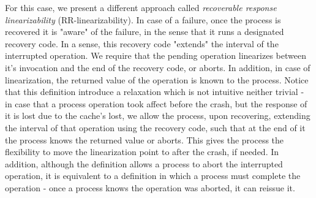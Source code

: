 \documentclass{article}
\begin{document}
For this case, we present a different approach called \emph{recoverable response linearizability} (RR-linearizability). In case of a failure, once the process is recovered it is "aware" of the failure, in the sense that it runs a designated recovery code. In a sense, this recovery code "extends" the interval of the interrupted operation. We require that the pending operation linearizes between it's invocation and the end of the recovery code, or aborts. In addition, in case of linearization, the returned value of the operation is known to the process. Notice that this definition introduce a relaxation which is not intuitive neither trivial - in case that a process operation took affect before the crash, but the response of it is lost due to the cache's lost, we allow the process, upon recovering, extending the interval of that operation using the recovery code, such that at the end of it the process knows the returned value or aborts. This gives the process the flexibility to move the linearization point to after the crash, if needed. In addition, although the definition allows a process to abort the interrupted operation, it is equivalent to a definition in which a process must complete the operation - once a process knows the operation was aborted, it can reissue it.


\iffalse
Progress properties are formally defined using histories. We follow [*] for these definitions. There are four types of steps: (1) an invocation step, denoted $(INV, p, X, op)$, represents the invocation by process $p$ of operation $op$ on implemented object $X$; (2) a response step, denoted $(RES, p, X, ret)$, represents the completion by process $p$ of the last operation it invoked on object $X$, with response $ret$; (3) a crash step, denoted $(CRASH, p)$, denotes a crash of process $p$; (4) a recovery step, denoted $(REC, p)$, denotes a recovery of process $p$;

A history $H$ is a sequence of steps, possibly involving multiple processes and implemented objects. For a given history $H$, we denote by $H \mid p$ the projection of $H$ onto the steps of process $p$. Similarly, we denote by $H \mid O$ the projection of $H$ onto the steps involving implemented object $O$. We adopt the convention that both $H \mid p$ and $H \mid O$ retain all crash steps in $H$. A response step is \emph{matching} with respect to an invocation step $s$ by a process $p$ on object $X$ in a history $H$ if it is the first response step by $p$ on $X$ that follows $s$ in $H$, and it occurs before p’s next invocation (if any) in $H$.
\fi
\end{document}
